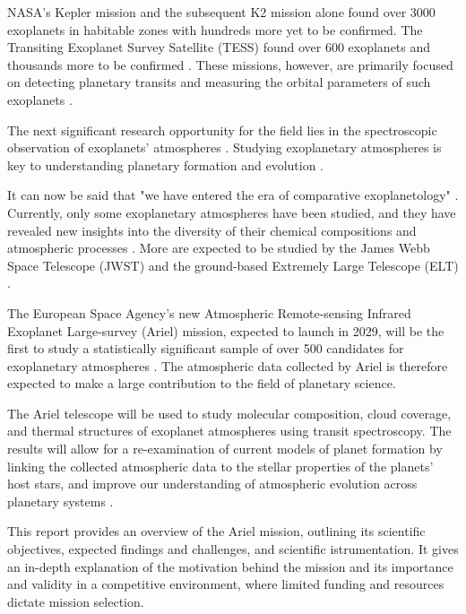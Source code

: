 \documentclass[12pt]{article}
\begin{document}
NASA's Kepler mission and the subsequent K2 mission alone found over 3000 exoplanets in habitable zones with hundreds more yet to be confirmed. The Transiting Exoplanet Survey Satellite (TESS)
found over 600 exoplanets and thousands more to be confirmed \cite{exoplanet_and_candidate_statitics_2025}. These missions, however, are primarily focused on detecting planetary transits and measuring the orbital parameters of such exoplanets \cite{zingales2018ariel}.

The next significant research opportunity for the field lies in the spectroscopic observation of exoplanets' atmospheres \cite{madhusudhan2019exoplanetary}.
Studying exoplanetary atmospheres is key to understanding planetary formation and evolution \cite{zingales2018ariel}.

It can now be said that "we have entered the era of comparative exoplanetology" \cite[p. 617]{madhusudhan2019exoplanetary}.
Currently, only some exoplanetary atmospheres have been studied, and they have revealed new insights into the diversity of their chemical compositions and atmospheric processes \cite{madhusudhan2019exoplanetary}.
More are expected to be studied by the James Webb Space Telescope (JWST) and the ground-based Extremely Large Telescope (ELT) \cite{beichman2014observations}.

The European Space Agency's new Atmospheric Remote-sensing Infrared Exoplanet Large-survey (Ariel) mission, expected to launch in 2029, will be the first to study a statistically significant sample of over
500 candidates for exoplanetary atmospheres \cite{zingales2018ariel}.
The atmospheric data collected by Ariel is therefore expected to make a large contribution to the field of planetary science.

The Ariel telescope will be used to study molecular composition, cloud coverage, and thermal structures of exoplanet atmospheres using transit spectroscopy. The results will allow for a re-examination of 
current models of planet formation by linking the collected atmospheric data to the stellar properties of the planets' host stars, and improve our understanding of atmospheric evolution across planetary systems \cite{edwards2019updated}.

This report provides an overview of the Ariel mission, outlining its scientific objectives, expected findings and challenges, and scientific istrumentation. It gives an in-depth explanation of the motivation behind the mission and its importance and validity
in a competitive environment, where limited funding and resources dictate mission selection.
\end{document}
